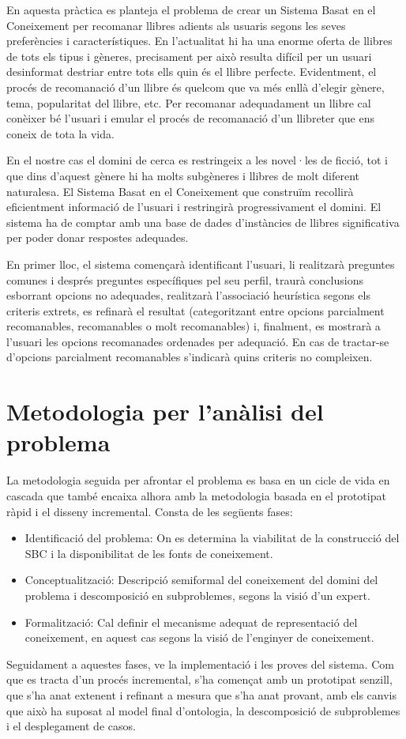 
En aquesta pràctica es planteja el problema de crear un Sistema Basat en el Coneixement per recomanar llibres adients als usuaris segons les seves preferències i característiques. En l'actualitat hi ha una enorme oferta de llibres de tots els tipus i gèneres, precisament per això resulta difícil per un usuari desinformat destriar entre tots ells quin és el llibre perfecte. Evidentment, el procés de recomanació d'un llibre és quelcom que va més enllà d'elegir gènere, tema, popularitat del llibre, etc. Per recomanar adequadament un llibre cal conèixer bé l'usuari i emular el procés de recomanació d'un llibreter que ens coneix de tota la vida.

En el nostre cas el domini de cerca es restringeix a les novel·les de ficció, tot i que dins d'aquest gènere hi ha molts subgèneres i llibres de molt diferent naturalesa. El Sistema Basat en el Coneixement que construïm recollirà eficientment informació de l'usuari i restringirà progressivament el domini. El sistema ha de comptar amb una base de dades d'instàncies de llibres significativa per poder donar respostes adequades.

En primer lloc, el sistema començarà identificant l'usuari, li realitzarà preguntes comunes i després preguntes específiques pel seu perfil, traurà conclusions esborrant opcions no adequades, realitzarà l'associació heurística segons els criteris extrets, es refinarà el resultat (categoritzant entre opcions parcialment recomanables, recomanables o molt recomanables) i, finalment, es mostrarà a l'usuari les opcions recomanades ordenades per adequació. En cas de tractar-se d'opcions parcialment recomanables s'indicarà quins criteris no compleixen.

\section{Metodologia per l'anàlisi del problema}

La metodologia seguida per afrontar el problema es basa en un cicle de vida en cascada que també encaixa alhora amb la metodologia basada en el prototipat ràpid i el disseny incremental. Consta de les següents fases:

\begin{itemize}
  \item Identificació del problema: On es determina la viabilitat de la construcció del SBC i la disponibilitat de les fonts de coneixement.
  \item Conceptualització: Descripció semiformal del coneixement del domini del problema i descomposició en subproblemes, segons la visió d'un expert.
  \item Formalització: Cal definir el mecanisme adequat de representació del coneixement, en aquest cas segons la visió de l'enginyer de coneixement.
\end{itemize}

Seguidament a aquestes fases, ve la implementació i les proves del sistema. Com que es tracta d'un procés incremental, s'ha començat amb un prototipat senzill, que s'ha anat extenent i refinant a mesura que s'ha anat provant, amb els canvis que això ha suposat al model final d'ontologia, la descomposició de subproblemes i el desplegament de casos.